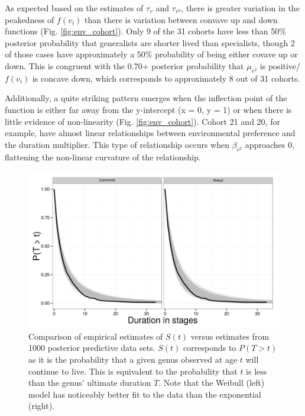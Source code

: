 \documentclass[12pt,letterpaper]{article}
\begin{document}
As expected based on the estimates of \(\tau_{v}\) and \(\tau_{v^{2}}\), there is greater variation in the peakedness of \(f(v_{i})\) than there is variation between convave up and down functions (Fig. \ref{fig:env_cohort}). Only 9 of the 31 cohorts have less than 50\% posterior probability that generalists are shorter lived than specialists, though 2 of those cases have approximately a 50\% probability of being either covave up or down. This is congruent with the 0.70+ posterior probability that \(\mu_{v^{2}}\) is positive/\(f(v_{i})\) is concave down, which corresponds to approximately 8 out of 31 cohorts.

Additionally, a quite striking pattern emerges when the inflection point of the function is either far away from the y-intercept (x = 0, y = 1) or when there is little evidence of non-linearity (Fig. \ref{fig:env_cohort}). Cohort 21 and 20, for example, have almost linear relationships between environmental preference and the duration multiplier. This type of relationship occurs when \(\beta_{v^{2}}\) approaches 0, flattening the non-linear curvature of the relationship.

\begin{figure}[ht]
  \centering
  \includegraphics[height = 0.5\textheight,width=\textwidth,keepaspectratio=true]{figure/survival_curves}
  \caption{Comparison of empirical estimates of \(S(t)\) versus estimates from 1000 posterior predictive data sets. \(S(t)\) corresponds to \(P(T > t)\) as it is the probability that a given genus observed at age \(t\) will continue to live. This is equivalent to the probability that \(t\) is less than the genus' ultimate duration \(T\). Note that the Weibull (left) model has noticeably better fit to the data than the exponential (right).}
  \label{fig:surv}
\end{figure}
\end{document}
